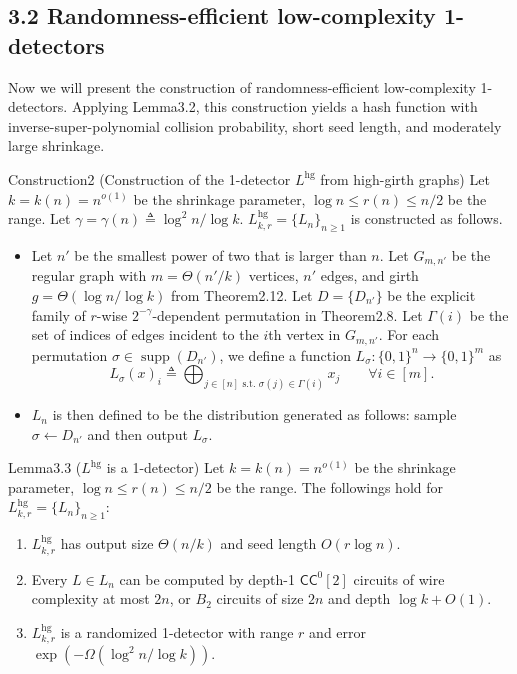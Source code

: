 \subsection*{3.2 Randomness-efficient low-complexity 1-detectors}
Now we will present the construction of randomness-efficient low-complexity 1-detectors. Applying Lemma3.2, this construction yields a hash function with inverse-super-polynomial collision probability, short seed length, and moderately large shrinkage.
\begin{authorclaim}{Construction2 (Construction of the 1-detector $L^{\mathrm{hg}}$ from high-girth graphs)}
Let $k=k(n)=n^{o(1)}$ be the shrinkage parameter, $\log n\le r(n)\le n/2$ be the range. Let $\gamma=\gamma(n)\triangleq\log^2n/\log k$. $L^{\mathrm{hg}}_{k,r}=\{L_n\}_{n\ge1}$ is constructed as follows.
\begin{itemize}
\item Let $n'$ be the smallest power of two that is larger than $n$. Let $G_{m,n'}$ be the regular graph with $m=\Theta(n'/k)$ vertices, $n'$ edges, and girth $g=\Theta(\log n/\log k)$ from Theorem2.12. Let $D=\{D_{n'}\}$ be the explicit family of $r$-wise $2^{-\gamma}$-dependent permutation in Theorem2.8. Let $\Gamma(i)$ be the set of indices of edges incident to the $i$th vertex in $G_{m,n'}$. For each permutation $\sigma\in\operatorname{supp}(D_{n'})$, we define a function $L_\sigma:\{0,1\}^n\to\{0,1\}^m$ as
\[L_\sigma(x)_i\triangleq\bigoplus_{j\in[n]\text{ s.t. }\sigma(j)\in\Gamma(i)}x_j\qquad\forall i\in[m].\]
\item $L_n$ is then defined to be the distribution generated as follows: sample $\sigma\leftarrow D_{n'}$ and then output $L_\sigma$.
\end{itemize}
\end{authorclaim}
\begin{authorclaim}{Lemma3.3 ($L^{\mathrm{hg}}$ is a 1-detector)}
Let $k=k(n)=n^{o(1)}$ be the shrinkage parameter, $\log n\le r(n)\le n/2$ be the range. The followings hold for $L^{\mathrm{hg}}_{k,r}=\{L_n\}_{n\ge1}$:
\begin{enumerate}
\item $L^{\mathrm{hg}}_{k,r}$ has output size $\Theta(n/k)$ and seed length $O(r\log n)$.
\item Every $L\in L_n$ can be computed by depth-1 $\mathsf{CC}^0[2]$ circuits of wire complexity at most $2n$, or $B_2$ circuits of size $2n$ and depth $\log k+O(1)$.
\item $L^{\mathrm{hg}}_{k,r}$ is a randomized 1-detector with range $r$ and error $\exp(-\Omega(\log^2n/\log k))$.
\end{enumerate}
\end{authorclaim}
